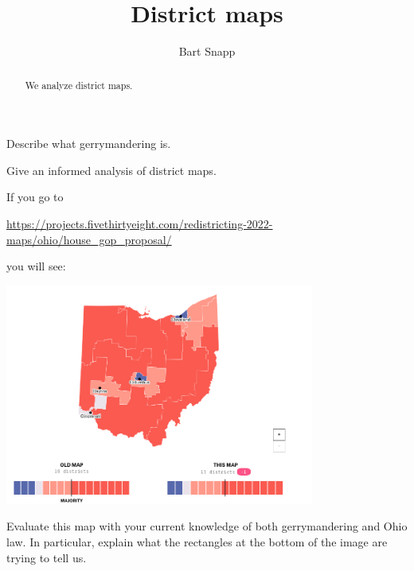 \documentclass[noauthor,nooutcomes,hints,handout]{ximera}
\title{District maps}
\author{Bart Snapp}
\begin{document}
\begin{abstract}
  We analyze district maps.
\end{abstract}
\maketitle

\begin{listOutcomes}
\item Describe what gerrymandering is.
\item Give an informed analysis of district maps.
\end{listOutcomes}




\mynewpage






\begin{question}
    If you go to
  \begin{center}
  \url{https://projects.fivethirtyeight.com/redistricting-2022-maps/ohio/house_gop_proposal/}
  \end{center}
  you will see:
  \begin{center}
    \includegraphics[width=4in]{houseGOP.png}
  \end{center}
  Evaluate this map with your current knowledge of both gerrymandering
  and Ohio law. In particular, explain what the rectangles at the
  bottom of the image are trying to tell us.
\end{question}


\mynewpage
\end{document}
